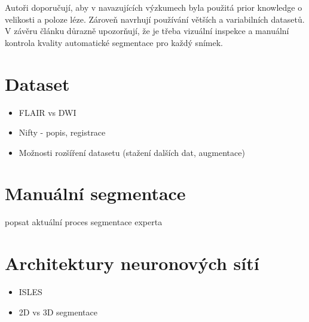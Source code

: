 \documentclass[11pt]{article}
\begin{document}
Autoři doporučují, aby v navazujících výzkumech byla použitá prior knowledge o velikosti a poloze léze. Zároveň navrhují používání větších a variabilních datasetů. V závěru článku důrazně upozorňují, že je třeba vizuální inspekce a manuální kontrola kvality automatické segmentace pro každý snímek.

\section{Dataset}
\begin{itemize}
	\item FLAIR vs DWI
	\item Nifty - popis, registrace
	\item Možnosti rozšíření datasetu (stažení dalších dat, augmentace)
\end{itemize}

\section{Manuální segmentace}
popsat aktuální proces segmentace experta

\section{Architektury neuronových sítí}
\begin{itemize}
	\item ISLES
	\item 2D vs 3D segmentace
\end{itemize}

\printbibliography
\end{document}
